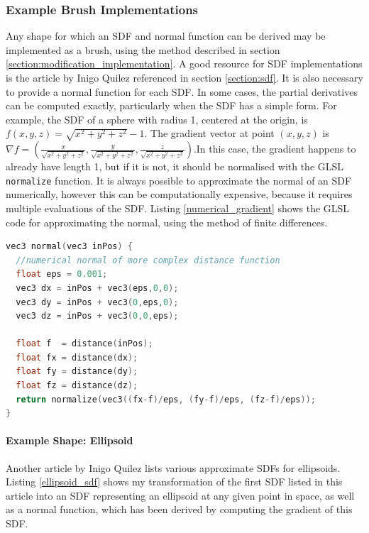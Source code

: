 \documentclass[11pt]{article}
\begin{document}
\subsubsection{Example Brush Implementations}
\label{example_brushes}
Any shape for which an SDF and normal function can be derived may be implemented as a brush, using the method described in section \ref{section:modification_implementation}. A good resource for SDF implementations is the article by Inigo Quilez referenced in section \ref{section:sdf}\cite{quilez:sdf}. It is also necessary to provide a normal function for each SDF. In some cases, the partial derivatives can be computed exactly, particularly when the SDF has a simple form. For example, the SDF of a sphere with radius 1, centered at the origin, is $f\left(x,y,z\right) = \sqrt{x^2+y^2+z^2}-1$. The gradient vector at point $\left(x,y,z\right)$ is $\nabla f = \left(\frac{x}{\sqrt{x^2+y^2+z^2}},\frac{y}{\sqrt{x^2+y^2+z^2}},\frac{z}{\sqrt{x^2+y^2+z^2}}\right)$.In this case, the gradient happens to already have length 1, but if it is not, it should be normalised with the GLSL \texttt{normalize} function. It is always possible to approximate the normal of an SDF numerically, however this can be computationally expensive, because it requires multiple evaluations of the SDF. Listing \ref{numerical_gradient} shows the GLSL code for approximating the normal, using the method of finite differences.

\begin{lstlisting}[language=C++,label={numerical_gradient},caption={Approximation of the normal of an SDF.}]
vec3 normal(vec3 inPos) {
  //numerical normal of more complex distance function
  float eps = 0.001;
  vec3 dx = inPos + vec3(eps,0,0);
  vec3 dy = inPos + vec3(0,eps,0);
  vec3 dz = inPos + vec3(0,0,eps);

  float f  = distance(inPos);
  float fx = distance(dx);
  float fy = distance(dy);
  float fz = distance(dz);
  return normalize(vec3((fx-f)/eps, (fy-f)/eps, (fz-f)/eps));
}
\end{lstlisting}

\paragraph{Example Shape: Ellipsoid}
Another article by Inigo Quilez\cite{quilez:ellipsoid} lists various approximate SDFs for ellipsoids. Listing \ref{ellipsoid_sdf} shows my transformation of the first SDF listed in this article into an SDF representing an ellipsoid at any given point in space, as well as a normal function, which has been derived by computing the gradient of this SDF.
\end{document}
